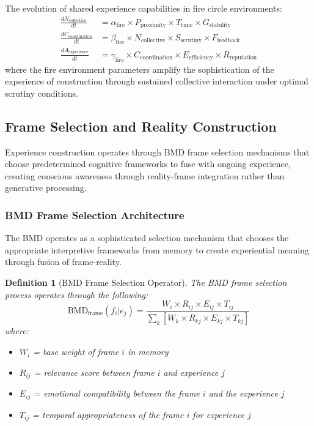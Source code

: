 \documentclass{article}
\newtheorem{definition}[theorem]{Definition}
\begin{document}
The evolution of shared experience capabilities in fire circle environments:
\begin{align}
\frac{dN_{\text{collective}}}{dt} &= \alpha_{\text{fire}} \times P_{\text{proximity}} \times T_{\text{time}} \times G_{\text{stability}} \\
\frac{dC_{\text{coordination}}}{dt} &= \beta_{\text{fire}} \times N_{\text{collective}} \times S_{\text{scrutiny}} \times F_{\text{feedback}} \\
\frac{dA_{\text{experience}}}{dt} &= \gamma_{\text{fire}} \times C_{\text{coordination}} \times E_{\text{efficiency}} \times R_{\text{reputation}}
\end{align}
where the fire environment parameters amplify the sophistication of the experience of construction through sustained collective interaction under optimal scrutiny conditions.

\subsection{Frame Selection and Reality Construction}

Experience construction operates through BMD frame selection mechanisms that choose predetermined cognitive frameworks to fuse with ongoing experience, creating conscious awareness through reality-frame integration rather than generative processing.

\subsubsection{BMD Frame Selection Architecture}

The BMD operates as a sophisticated selection mechanism that chooses the appropriate interpretive frameworks from memory to create experiential meaning through fusion of frame-reality.

\begin{definition}[BMD Frame Selection Operator]
The BMD frame selection process operates through the following:
\begin{equation}
\text{BMD}_{\text{frame}}(f_i | e_j) = \frac{W_i \times R_{ij} \times E_{ij} \times T_{ij}}{\sum_k[W_k \times R_{kj} \times E_{kj} \times T_{kj}]}
\end{equation}
where:
\begin{itemize}
\item $W_i$ = base weight of frame $i$ in memory
\item $R_{ij}$ = relevance score between frame $i$ and experience $j$
\item $E_{ij}$ = emotional compatibility between the frame $i$ and the experience $j$
\item $T_{ij}$ = temporal appropriateness of the frame $i$ for experience $j$
\end{itemize}
\end{definition}
\end{document}
